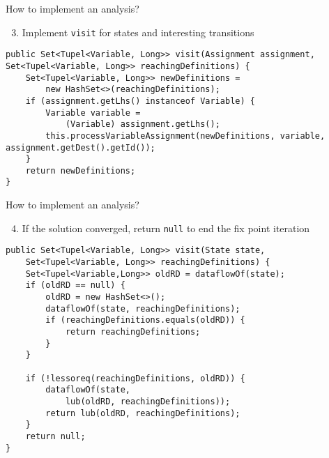 \documentclass[xcolor={usenames,dvipsnames}, aspectratio=169, 12pt]{beamer}
\begin{document}
\begin{frame}[fragile]{How to implement an analysis?}
\begin{enumerate}
	\setcounter{enumi}{2}
	\item Implement \texttt{visit} for states and interesting transitions
\end{enumerate}

\begin{lstlisting}
public Set<Tupel<Variable, Long>> visit(Assignment assignment, Set<Tupel<Variable, Long>> reachingDefinitions) {
	Set<Tupel<Variable, Long>> newDefinitions =
		new HashSet<>(reachingDefinitions);
	if (assignment.getLhs() instanceof Variable) {
		Variable variable =
			(Variable) assignment.getLhs();
		this.processVariableAssignment(newDefinitions, variable, assignment.getDest().getId());
	}
	return newDefinitions;
}
\end{lstlisting}
\end{frame}

\begin{frame}[fragile]{How to implement an analysis?}
\begin{enumerate}
	\setcounter{enumi}{3}
	\item If the solution converged, return \texttt{null} to end the fix point iteration
\end{enumerate}

\vspace{-0.3cm}
\begin{lstlisting}
public Set<Tupel<Variable, Long>> visit(State state,
	Set<Tupel<Variable, Long>> reachingDefinitions) {
	Set<Tupel<Variable,Long>> oldRD = dataflowOf(state);
	if (oldRD == null) {
		oldRD = new HashSet<>();
		dataflowOf(state, reachingDefinitions);
		if (reachingDefinitions.equals(oldRD)) {
			return reachingDefinitions;
		}
	}
	
	if (!lessoreq(reachingDefinitions, oldRD)) {
		dataflowOf(state,
			lub(oldRD, reachingDefinitions));
		return lub(oldRD, reachingDefinitions);
	}
	return null;
}
\end{lstlisting}
\end{frame}
\end{document}
